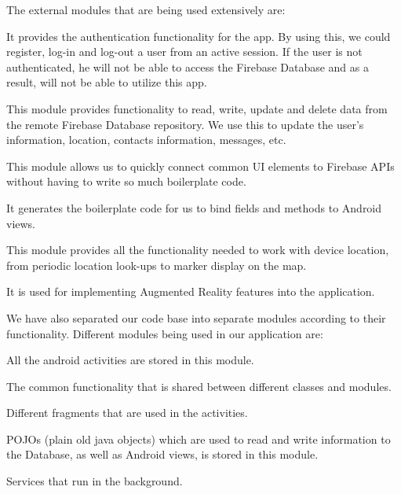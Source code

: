 The external modules that are being used extensively are:
\begin{description}[font=$\bullet$~, leftmargin=0cm]
    \item[FirebaseAuth] It provides the authentication functionality for the app. By using this, we could register, log-in and log-out a user from an active session. If the user is not authenticated, he will not be able to access the Firebase Database and as a result, will not be able to utilize this app.
    \item[FirebaseDatabase] This module provides functionality to read, write, update and delete data from the remote Firebase Database repository. We use this to update the user's information, location, contacts information, messages, etc.
    \item[FirebaseUI] This module allows us to quickly connect common UI elements to Firebase APIs without having to write so much boilerplate code\cite{FirebaseUI2018}.
    \item[ButterKnife] It generates the boilerplate code for us to bind fields and methods to Android views.
    \item[GoogleMap] This module provides all the functionality needed to work with device location, from periodic location look-ups to marker display on the map.
    \item[ARCore] It is used for implementing Augmented Reality features into the application.
\end{description}

We have also separated our code base into separate modules according to their functionality. Different modules being used in our application are:
\begin{description}[font=$\bullet$~, leftmargin=0cm]
    \item[Activities] All the android activities are stored in this module.
    \item[Common] The common functionality that is shared between different classes and modules.
    \item[Fragments] Different fragments that are used in the activities.
    \item[Models] POJOs (plain old java objects) which are used to read and write information to the Database, as well as Android views, is stored in this module.
    \item[Services] Services that run in the background.
\end{description}


